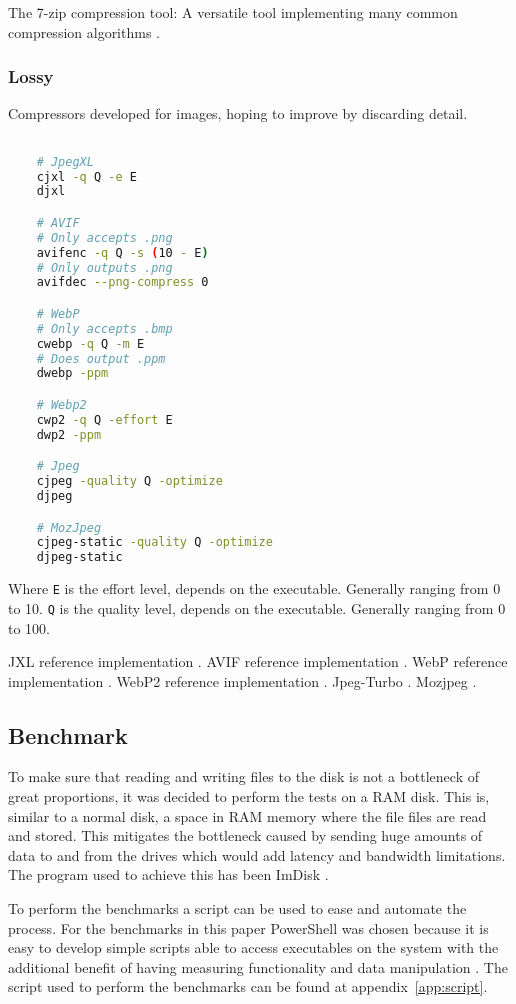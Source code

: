 \documentclass[11pt,a4paper]{report}
\begin{document}
The 7-zip compression tool: A versatile tool implementing many common compression algorithms \cite{7zip}.

\subsubsection{Lossy}

Compressors developed for images, hoping to improve by discarding detail.

\begin{lstlisting}[language = bash]

    # JpegXL
    cjxl -q Q -e E
    djxl

    # AVIF
    # Only accepts .png
    avifenc -q Q -s (10 - E)
    # Only outputs .png
    avifdec --png-compress 0

    # WebP
    # Only accepts .bmp
    cwebp -q Q -m E
    # Does output .ppm
    dwebp -ppm

    # Webp2
    cwp2 -q Q -effort E
    dwp2 -ppm

    # Jpeg
    cjpeg -quality Q -optimize
    djpeg

    # MozJpeg
    cjpeg-static -quality Q -optimize
    djpeg-static

\end{lstlisting}

Where \verb|E| is the effort level, depends on the executable. Generally ranging from 0 to 10. \verb|Q| is the quality level, depends on the executable. Generally ranging from 0 to 100.

JXL reference implementation \cite{jxl}. AVIF reference implementation \cite{avif}. WebP reference implementation \cite{webp}. WebP2 reference implementation \cite{webp2}. Jpeg-Turbo \cite{jpegturbo}. Mozjpeg \cite{mozjpeg}.

\subsection{Benchmark}

To make sure that reading and writing files to the disk is not a bottleneck of great proportions, it was decided to perform the tests on a RAM disk. This is, similar to a normal disk, a space in RAM memory where the file files are read and stored. This mitigates the bottleneck caused by sending huge amounts of data to and from the drives which would add latency and bandwidth limitations. The program used to achieve this has been ImDisk \cite{imdisk}.

To perform the benchmarks a script can be used to ease and automate the process. For the benchmarks in this paper PowerShell was chosen because it is easy to develop simple scripts able to access executables on the system with the additional benefit of having measuring functionality and data manipulation \cite{ps}. The script used to perform the benchmarks can be found at appendix~\ref{app:script}.
\end{document}
